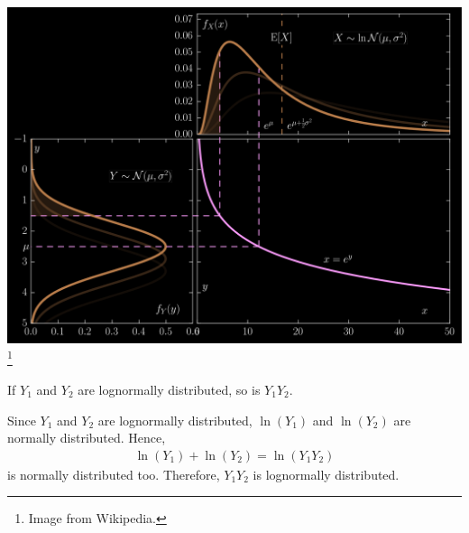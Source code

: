 \begin{frame}[fragile,t]
\begin{center}
	\includegraphics[scale=0.15]{figs/Lognormal_Distribution-neg.png}\footnote{Image from Wikipedia.}
\end{center}
\end{frame}
\begin{frame}[fragile,t]
	\begin{mythm}
		If $Y_1$ and $Y_2$ are lognormally distributed, so is $Y_1Y_2$.
	\end{mythm}
	\bigskip
	\pause
	\begin{myproof}
		Since $Y_1$ and $Y_2$ are lognormally distributed, $\ln(Y_1)$ and $\ln(Y_2)$ are normally
		distributed. Hence,
		\begin{align*}
			\ln(Y_1) + \ln(Y_2) = \ln(Y_1Y_2)
		\end{align*}
		is normally distributed too. Therefore, $Y_1Y_2$ is lognormally distributed.
		\myEnd
	\end{myproof}
\end{frame}
